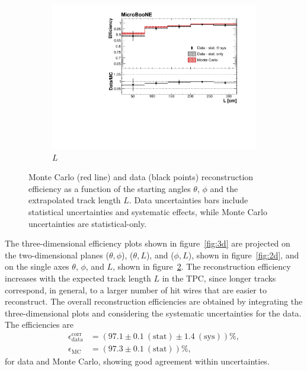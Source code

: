 \documentclass[a4paper,11pt]{article}
\begin{document}
\begin{figure}[htbp]
\begin{center}
\begin{subfigure}{0.5\textwidth}
      \includegraphics[width=\linewidth]{figures/l2.pdf}
      \caption{$L$} \label{fig:l}
    \end{subfigure}
    \caption{Monte Carlo (red line) and data (black points) reconstruction efficiency as a function of the starting angles $\theta$, $\phi$ and the extrapolated track length $L$. Data uncertainties bars include statistical uncertainties and systematic effects, while Monte Carlo uncertainties are statistical-only.}\label{fig:1d}
  \end{center}
\end{figure}

The three-dimensional efficiency plots shown in figure~\ref{fig:3d} are projected on the two-dimensional planes ($\theta,\phi$), ($\theta,L$), and ($\phi,L$), shown in figure~\ref{fig:2d}, and on the single axes $\theta$, $\phi$, and $L$, shown in figure~\ref{fig:1d}.
The reconstruction efficiency increases with the expected track length $L$ in the TPC, since longer tracks correspond, in general, to a larger number of hit wires that are easier to reconstruct.
The overall reconstruction efficiencies are obtained by integrating the three-dimensional plots and considering the systematic uncertainties for the data. The efficiencies are
\begin{align}
\epsilon_{\mathrm{data}}^{\mathrm{corr}} &= (97.1 \pm 0.1~\mathrm{(stat)} \pm 1.4~\mathrm{(sys)})\%,\\
\epsilon_{\mathrm{MC}} &= (97.3 \pm 0.1~\mathrm{(stat)})\%,\nonumber
\end{align} for data and Monte Carlo, showing good agreement within uncertainties.
\end{document}
